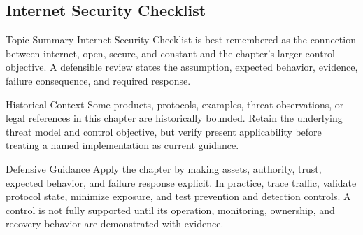 \documentclass[11pt,letterpaper]{article}
\begin{document}
\subsection*{Internet Security Checklist}
\begin{CornellNotesTable}
\end{CornellNotesTable}
\begin{CornellSummaryBox}{Topic Summary}
Internet Security Checklist is best remembered as the connection between internet, open, secure, and constant and the chapter's larger control objective. A defensible review states the assumption, expected behavior, evidence, failure consequence, and required response.
\end{CornellSummaryBox}
\begin{CornellWarningBox}{Historical Context}
Some products, protocols, examples, threat observations, or legal references in this chapter are historically bounded. Retain the underlying threat model and control objective, but verify present applicability before treating a named implementation as current guidance.
\end{CornellWarningBox}
\begin{CornellOverviewBox}{Defensive Guidance}
Apply the chapter by making assets, authority, trust, expected behavior, and failure response explicit. In practice, trace traffic, validate protocol state, minimize exposure, and test prevention and detection controls. A control is not fully supported until its operation, monitoring, ownership, and recovery behavior are demonstrated with evidence.
\end{CornellOverviewBox}
\end{document}
